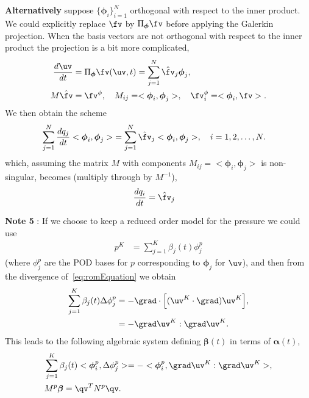 \documentclass[11pt]{article}
\newcommand{\phiv}{\boldsymbol{\phi}}
\newcommand{\alphav}{\boldsymbol{\alpha}}
\newcommand{\betav}{\boldsymbol{\beta}}
\begin{document}
{\bf Alternatively} suppose $\{ \phiv_i\}_{i=1}^N$ orthogonal with respect to the inner product.
We could explicitly replace $\fv$ by $\Pi_{\phiv} \fv$ before applying the Galerkin projection. When the basis vectors
are not orthogonal with respect to the inner product the projection is a bit more complicated, 
\begin{align}
   \frac{ d\uv}{dt} & = \Pi_{\phiv}\fv(\uv,t)= \sum_{j=1}^N \hat{\fv}_j \phiv_j, \\
    M \hat{\fv} &= \fv^\phi, \quad M_{ij} = <\phiv_i,\phiv_j>, \quad \fv^\phi_i = <\phiv_i,\fv>. 
\end{align}
We then obtain the scheme 
\begin{align}
  \sum_{j=1}^N \frac{ d q_j}{dt} <\phiv_i,\phiv_j>  & = \sum_{j=1}^N \hat{\fv}_j <\phiv_i,\phiv_j>, \quad i=1,2,\ldots,N.
\end{align}
which, assuming the matrix $M$ with components $M_{ij}=<\phiv_i,\phiv_j>$ is non-singular, becomes (multiply through by $M^{-1}$), 
\begin{align}
  \frac{ d q_i}{dt} & = \hat{\fv}_j 
\end{align}



{\bf Note 5} : If we choose to keep a reduced order model for the pressure we could use
\begin{align}
         p^K &= \sum_{j=1}^K \beta_j(t) \phi_j^p    
\end{align}
(where $\phi_j^p$ are the POD bases for $p$ corresponding to $\phiv_j$ for $\uv$), 
and then from the divergence of~\eqref{eq:romEquation} we obtain 
\begin{align}
   \sum_{j=1}^K \beta_j(t) \Delta \phi_j^p &= - \grad\cdot\Big[ (\uv^K\cdot\grad)\uv^K \Big], \\
                                           &= - \grad\uv^K : \grad\uv^K. 
\end{align}
This leads to the following algebraic system defining
$\betav(t)$ in terms of $\alphav(t)$, 
\begin{align}
  &  \sum_{j=1}^K \beta_j(t) < \phiv_i^p, \Delta \phi_j^p > = - <\phiv_i^p, \grad\uv^K : \grad\uv^K >, \\
  &    M^p \betav = \qv^T N^p \qv.
\end{align}
\end{document}
